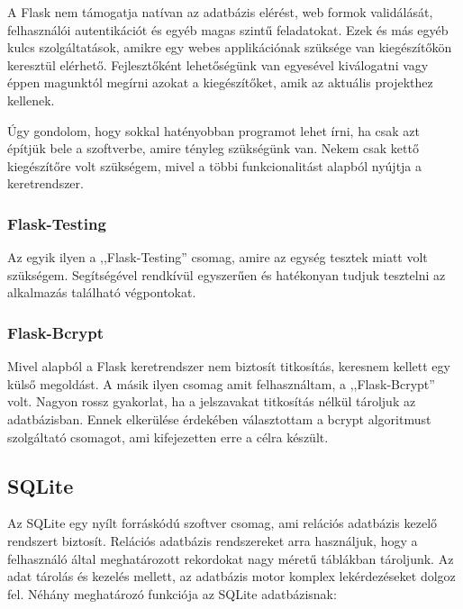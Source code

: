 \documentclass{thesis-ekf}
\theoremstyle{definition}
\theoremstyle{remark}
\begin{document}
A Flask nem támogatja natívan az adatbázis elérést, web formok validálását, felhasználói autentikációt és egyéb magas szintű feladatokat.
Ezek és más egyéb kulcs szolgáltatások, amikre egy webes applikációnak szüksége van kiegészítőkön keresztül elérhető.
Fejlesztőként lehetőségünk van egyesével kiválogatni vagy éppen magunktól megírni azokat a kiegészítőket, amik az aktuális projekthez kellenek.
\cite{flask}

Úgy gondolom, hogy sokkal hatényobban programot lehet írni, ha csak azt építjük bele a szoftverbe, amire tényleg szükségünk van.
Nekem csak kettő kiegészítőre volt szükségem, mivel a többi funkcionalitást alapból nyújtja a keretrendszer.

\subsubsection{Flask-Testing}

Az egyik ilyen a ,,Flask-Testing'' csomag, amire az egység tesztek miatt volt szükségem.
Segítségével rendkívül egyszerűen és hatékonyan tudjuk tesztelni az alkalmazás található végpontokat.

\subsubsection{Flask-Bcrypt}

Mivel alapból a Flask keretrendszer nem biztosít titkosítás, keresnem kellett egy külső megoldást.
A másik ilyen csomag amit felhasználtam, a ,,Flask-Bcrypt'' volt.
Nagyon rossz gyakorlat, ha a jelszavakat titkosítás nélkül tároljuk az adatbázisban.
Ennek elkerülése érdekében választottam a bcrypt algoritmust szolgáltató csomagot, ami kifejezetten erre a célra készült.

\subsection{SQLite}

Az SQLite egy nyílt forráskódú szoftver csomag, ami relációs adatbázis kezelő rendszert biztosít.
Relációs adatbázis rendszereket arra használjuk, hogy a felhasználó által meghatározott rekordokat nagy méretű táblákban tároljunk.
Az adat tárolás és kezelés mellett, az adatbázis motor komplex lekérdezéseket dolgoz fel.
Néhány meghatározó funkciója az SQLite adatbázisnak:
\end{document}
